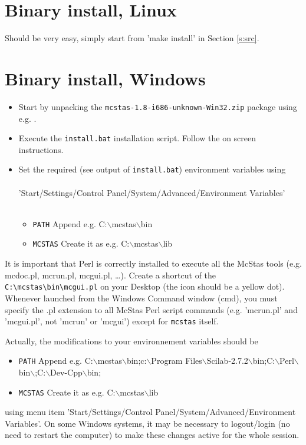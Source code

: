 \section{Binary install, Linux}
\label{s:linbin}
Should be very easy, simply start from 'make install' in Section \ref{s:src}.

\section{Binary install, Windows}
\label{s:winbin}
\begin{itemize}
\item{Start by unpacking the \texttt{mcstas-1.8-i686-unknown-Win32.zip} package using
e.g. .}
\item{Execute the \texttt{install.bat} installation script. Follow the
  on screen instructions.}
\item{Set the required (see output of \texttt{install.bat}) environment variables using
\\\ \\
\noindent 'Start/Settings/Control Panel/System/Advanced/Environment
Variables'\\\ 
  \begin{itemize}
    \item{\verb+PATH+ Append e.g. C:$\backslash$mcstas$\backslash$bin}
    \item{\verb+MCSTAS+ Create it as e.g. C:$\backslash$mcstas$\backslash$lib}
  \end{itemize}}
\end{itemize}
It is important that Perl is correctly installed to execute all the McStas tools (e.g. mcdoc.pl, mcrun.pl, mcgui.pl, \ldots). Create a shortcut of the \verb+C:\mcstas\bin\mcgui.pl+ on your Desktop (the icon should be a yellow dot). Whenever launched from the Windows Command window (cmd), you must specify the .pl extension to all McStas Perl script commands (e.g. 'mcrun.pl' and 'mcgui.pl', not 'mcrun' or 'mcgui') except for \verb+mcstas+ itself.

Actually, the modifications to your environnement variables should be
\begin{itemize}
    \item{\verb+PATH+ Append e.g. 
    C:$\backslash$mcstas$\backslash$bin;c:$\backslash$Program Files$\backslash$Scilab-2.7.2$\backslash$bin;C:$\backslash$Perl$\backslash$bin$\backslash$;C:$\backslash$Dev-Cpp$\backslash$bin;}
    \item{\verb+MCSTAS+ Create it as e.g. C:$\backslash$mcstas$\backslash$lib}
\end{itemize}
using menu item 'Start/Settings/Control Panel/System/Advanced/Environment Variables'. On some Windows systems, it may be necessary to logout/login (no need to restart the computer) to make these changes active for the whole session.

